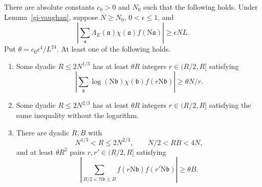 \begin{proposition}\label{gi-extraction}
There are absolute constants $c_0>0$ and $N_0$ such that the following
holds.  Under Lemma~\ref{gi-vaughan}, suppose $N\geq N_0$,
$0<\epsilon\leq1$, and
\begin{equation}\label{gi-large-correlation}
 \left|\sum_{\mathfrak a}\Lambda_E(\mathfrak a)\chi(\mathfrak a)
                         f(\mathrm N\mathfrak a)\right|\geq\epsilon NL.
\end{equation}
Put $\theta=c_0\epsilon^4/L^{24}$.  At least one of the following holds.
\begin{enumerate}
\item Some dyadic $R\leq2N^{1/3}$ has at least $\theta R$ integers
$r\in(R/2,R]$ satisfying
\[
 \left|\sum_{\mathfrak b}\log(\mathrm N\mathfrak b)\chi(\mathfrak b)
                   f(r\mathrm N\mathfrak b)\right|\geq\theta N/r.
\]
\item Some dyadic $R\leq2N^{2/3}$ has at least $\theta R$ integers
$r\in(R/2,R]$ satisfying the same inequality without the logarithm.
\item There are dyadic $R,B$ with
\begin{equation}\label{gi-dyadic-ranges}
 N^{1/3}<R\leq2N^{2/3},\qquad N/2<RB<4N,
\end{equation}
and at least $\theta R^2$ pairs $r,r'\in(R/2,R]$ satisfying
\begin{equation}\label{gi-type-two-correlation}
 \left|\sum_{B/2<\mathrm N\mathfrak b\leq B}
       f(r\mathrm N\mathfrak b)\overline{f(r'\mathrm N\mathfrak b)}
       \right|\geq\theta B.
\end{equation}
\end{enumerate}
\end{proposition}
